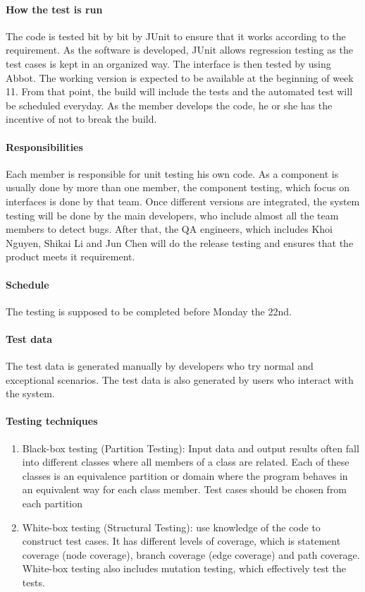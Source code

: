 \documentclass[11pt, a4paper]{report}
\begin{document}
\paragraph{How the test is run}
The code is tested bit by bit by JUnit to ensure that it works according to the requirement. As the software is developed, JUnit allows regression testing as the test cases is kept in an organized way.  The interface is then tested by using Abbot. The working version is expected to be available at the beginning of week 11. From that point, the build will include the tests and the automated test will be scheduled everyday. As the member develops the code, he or she has the incentive of not to break the build.   
\paragraph{Responsibilities}
Each member is responsible for unit testing his own code. As a component is usually done by more than one member, the component testing, which focus on interfaces is done by that team. Once different versions are integrated, the system testing will be done by the main developers, who include almost all the team members to detect bugs. After that, the QA engineers, which includes Khoi Nguyen, Shikai Li and Jun Chen will do the release testing and ensures that the product meets it requirement.
\paragraph{Schedule}
The testing is supposed to be completed before Monday the 22nd.
\paragraph{Test data}
The test data is generated manually by developers who try normal and exceptional scenarios. The test data is also generated by users who interact with the system.
\paragraph{Testing techniques}
\begin{enumerate}
  \item Black-box testing (Partition Testing): Input data and output results often fall into different classes where all members of a class are related. Each of these classes is an equivalence partition or domain where the program behaves in an equivalent way for each class member.  Test cases should be chosen from each partition
	\item White-box testing (Structural Testing): use knowledge of the code to construct test cases. It has different levels of coverage, which is statement coverage (node coverage), branch coverage (edge coverage) and path coverage. White-box testing also includes mutation testing, which effectively test the tests.	
\end{enumerate}
\end{document}
